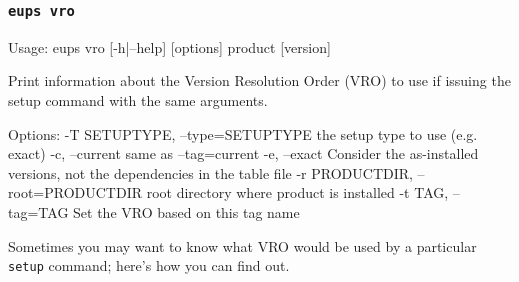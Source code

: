 \documentclass{article}
\newcommand{\code}[1]{\texttt{#1}}
\let\overbatim=\verbatim
\let\oendverbatim=\endverbatim
\renewenvironment{verbatim}
{\center\minipage{16cm}\overbatim}
{\oendverbatim\endminipage\endcenter}
\begin{document}
\subsubsection{\code{eups vro}}
\begin{verbatim}Usage: eups vro [-h|--help] [options] product [version]

Print information about the Version Resolution Order (VRO) to use if issuing
the setup command with the same arguments.

Options:
  -T SETUPTYPE, --type=SETUPTYPE
                        the setup type to use (e.g. exact)
  -c, --current         same as --tag=current
  -e, --exact           Consider the as-installed versions, not the
                        dependencies in the table file
  -r PRODUCTDIR, --root=PRODUCTDIR
                        root directory where product is installed
  -t TAG, --tag=TAG     Set the VRO based on this tag name
\end{verbatim}

Sometimes you may want to know what VRO would be used by a particular \code{setup} command; here's how you can
find out.

\end{document}
